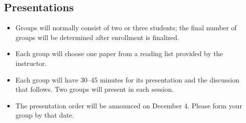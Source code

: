 \documentclass[11pt,a4paper]{article}
\begin{document}
\subsection{Presentations}

\begin{itemize}
  \item Groups will normally consist of two or three students; the final number
        of groups will be determined after enrollment is finalized.
  \item Each group will choose one paper from a reading list provided by the
        instructor.
  \item Each group will have 30--45 minutes for its presentation and the
        discussion that follows. Two groups will present in each session.
  \item The presentation order will be announced on December 4. Please form
        your group by that date.
\end{itemize}
\end{document}
